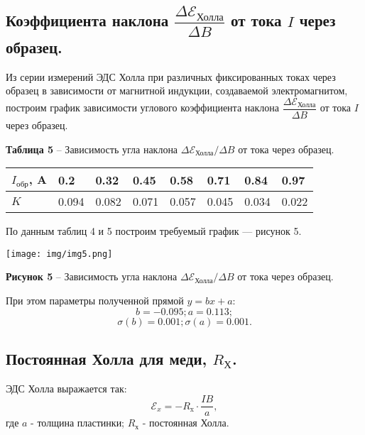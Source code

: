 \documentclass[12pt,a4paper]{article}
\begin{document}
    \subsection{Коэффициента наклона $\dfrac{\Delta \mathcal{E}_\text{Холла}}{\Delta B}$ от тока $I$ через образец.}
        Из серии измерений ЭДС Холла при различных фиксированных токах через образец в зависимости от магнитной индукции, создаваемой электромагнитом, построим график зависимости углового коэффициента наклона $\dfrac{\Delta \mathcal{E}_\text{Холла}}{\Delta B}$ от тока $I$ через образец.
        \begin{table}[!h]
            \begin{flushleft}%
           		\textbf{Таблица 5} -- Зависимость угла наклона $\Delta \mathcal{E}_\text{Холла}/\Delta B$ от тока через образец.\\
            \end{flushleft}
            \begin{center}
                \begin{tabular}{ | l | l | l | l | l | l | l | l |}
                    \hline
                    $I_\text{обр}$, A& 0.2   & 0.32  & 0.45  & 0.58  & 0.71  & 0.84  & 0.97   \\
                    \hline      
                    $K$         & 0.094 & 0.082 & 0.071 & 0.057 & 0.045 & 0.034 & 0.022   \\
                    \hline    
                \end{tabular}
            \end{center}
        \end{table}
        
        По данным таблиц 4 и 5 построим требуемый график --- рисунок 5. 
        \begin{center}
            \texttt{[image: img/img5.png]}
	
	        \textbf{Рисунок 5} -- Зависимость угла наклона $\Delta \mathcal{E}_\text{Холла}/\Delta B$ от тока через образец. 
        \end{center}

        При этом параметры полученной прямой $y = bx + a$: 
        \[
        b = -0.095; a = 0.113; 
        \]
        \[
        \sigma(b) =  0.001; \sigma(a) =  0.001.
        \]
	    
    \subsection{Постоянная Холла для меди, $R_\text{Х}$.}
        ЭДС Холла выражается так:
        \[
        \mathcal{E}_x = -R_\text{x}\cdot \dfrac{IB}{a},
        \]
        где $a$ - толщина пластинки; $R_\text{х}$ - постоянная Холла.
        
\end{document}
